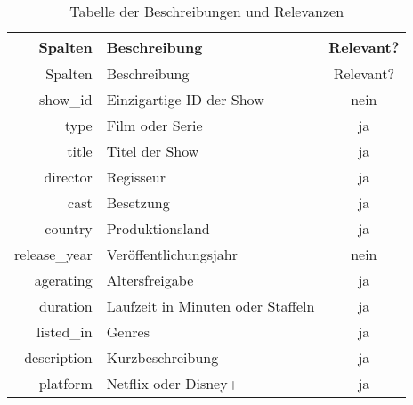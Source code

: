 \documentclass[
]{article}
\begin{document}
\begin{longtable}[]{@{}rlc@{}}
\caption{Tabelle der Beschreibungen und Relevanzen}\tabularnewline
\toprule\noalign{}
Spalten & Beschreibung & Relevant? \\
\midrule\noalign{}
\endfirsthead
\toprule\noalign{}
Spalten & Beschreibung & Relevant? \\
\midrule\noalign{}
\endhead
\bottomrule\noalign{}
\endlastfoot
show\_id & Einzigartige ID der Show & nein \\
type & Film oder Serie & ja \\
title & Titel der Show & ja \\
director & Regisseur & ja \\
cast & Besetzung & ja \\
country & Produktionsland & ja \\
release\_year & Veröffentlichungsjahr & nein \\
agerating & Altersfreigabe & ja \\
duration & Laufzeit in Minuten oder Staffeln & ja \\
listed\_in & Genres & ja \\
description & Kurzbeschreibung & ja \\
platform & Netflix oder Disney+ & ja \\
\end{longtable}
\end{document}
